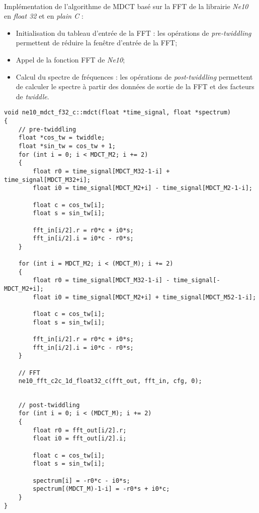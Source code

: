 \documentclass{article}
\begin{document}
\paragraph{}
Implémentation de l'algorithme de MDCT basé sur la FFT de la librairie \emph{Ne10} en \emph{float 32} et en \emph{plain C} :
\begin{itemize}
    \item Initialisation du tableau d'entrée de la FFT : les opérations de \emph{pre-twiddling} permettent de réduire la fenêtre d'entrée de la FFT;
    \item Appel de la fonction FFT de \emph{Ne10};
    \item Calcul du spectre de fréquences : les opérations de \emph{post-twiddling} permettent de calculer le spectre à partir des données de sortie de la FFT et des facteurs de \emph{twiddle}.
\end{itemize}
\lstset{language=C++}
\begin{lstlisting}
void ne10_mdct_f32_c::mdct(float *time_signal, float *spectrum)
{
    // pre-twiddling
    float *cos_tw = twiddle;
    float *sin_tw = cos_tw + 1;
    for (int i = 0; i < MDCT_M2; i += 2)
    {
        float r0 = time_signal[MDCT_M32-1-i] + time_signal[MDCT_M32+i];
        float i0 = time_signal[MDCT_M2+i] - time_signal[MDCT_M2-1-i];

        float c = cos_tw[i];
        float s = sin_tw[i];

        fft_in[i/2].r = r0*c + i0*s;
        fft_in[i/2].i = i0*c - r0*s;
    }

    for (int i = MDCT_M2; i < (MDCT_M); i += 2)
    {
        float r0 = time_signal[MDCT_M32-1-i] - time_signal[-MDCT_M2+i];
        float i0 = time_signal[MDCT_M2+i] + time_signal[MDCT_M52-1-i];

        float c = cos_tw[i];
        float s = sin_tw[i];

        fft_in[i/2].r = r0*c + i0*s;
        fft_in[i/2].i = i0*c - r0*s;
    }

    // FFT
    ne10_fft_c2c_1d_float32_c(fft_out, fft_in, cfg, 0);
\end{lstlisting}
\newpage
\begin{lstlisting}

    // post-twiddling
    for (int i = 0; i < (MDCT_M); i += 2)
    {
        float r0 = fft_out[i/2].r;
        float i0 = fft_out[i/2].i;

        float c = cos_tw[i];
        float s = sin_tw[i];

        spectrum[i] = -r0*c - i0*s;
        spectrum[(MDCT_M)-1-i] = -r0*s + i0*c;
    }
}
\end{lstlisting}
\end{document}
